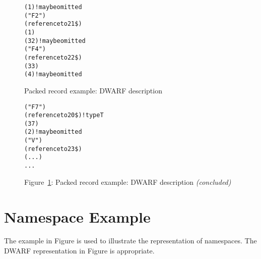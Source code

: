 \begin{figure}[p]
\begin{dwflisting}
\begin{alltt}
            (1) ! may be omitted
            ("F2")
            (reference to 21\$)
            (1)
            (32) ! may be omitted
            ("F4")
            (reference to 22\$)
            (33)
            (4) ! may be omitted
\end{alltt}
\end{dwflisting}
\caption{Packed record example: DWARF description}
\label{fig:packedrecordexampledwarfdescription}
\end{figure}

\begin{figure}[p]
\begin{dwflisting}
\begin{alltt}
            ("F7")
            (reference to 20\$)    ! type T
            (37)
            (2)               ! may be omitted
        ("V")
        (reference to 23\$)
        (...)
        ...
\end{alltt}
\end{dwflisting}
\begin{center}
Figure~\ref{fig:packedrecordexampledwarfdescription}: Packed record example: DWARF description \textit{(concluded)}
\end{center}
\end{figure}

\section{Namespace Example}
\label{app:namespaceexample}

The  example in 
Figure 
is used 
to illustrate the representation of namespaces.
The DWARF representation in 
Figure 
is appropriate.

